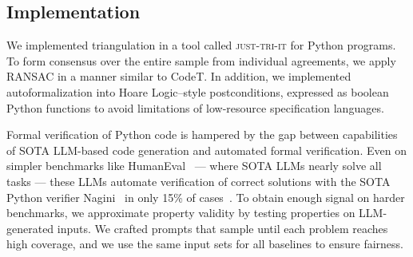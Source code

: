 \documentclass[acmsmall,screen,nonacm]{acmart}
\newcommand{\toolName}{\textsc{just-tri-it}\xspace}
\begin{document}
\subsection{Implementation}
\label{sec:implementation}

We implemented triangulation in a tool called \toolName for Python programs. To form consensus over the entire sample from individual agreements, we apply RANSAC in a manner similar to CodeT. In addition, we implemented autoformalization into Hoare Logic–style postconditions, expressed as boolean Python functions to avoid limitations of low-resource specification languages.

Formal verification of Python code is hampered by the gap between capabilities of SOTA LLM-based code generation and automated formal verification. Even on simpler benchmarks like HumanEval~\cite{chen2021evaluating} --- where SOTA LLMs nearly solve all tasks --- these LLMs automate verification of correct solutions with the SOTA Python verifier Nagini~\cite{eilers2018nagini} in only 15\% of cases~\cite{shefer2025can}. To obtain enough signal on harder benchmarks, we approximate property validity by testing properties on LLM-generated inputs. We crafted prompts that sample until each problem reaches high coverage, and we use the same input sets for all baselines to ensure fairness.
\end{document}
